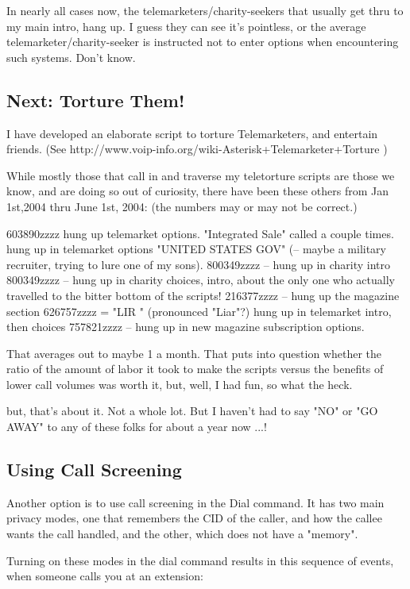 In nearly all cases now, the telemarketers/charity-seekers that
usually get thru to my main intro, hang up. I guess they can see it's
pointless, or the average telemarketer/charity-seeker is instructed
not to enter options when encountering such systems. Don't know. 


\subsection{Next: Torture Them!}

I have developed an elaborate script to torture Telemarketers, and
entertain friends. (See
http://www.voip-info.org/wiki-Asterisk+Telemarketer+Torture )

While mostly those that call in and traverse my teletorture scripts
are those we know, and are doing so out of curiosity, there have been
these others from Jan 1st,2004 thru June 1st, 2004:
(the numbers may or may not be correct.)

603890zzzz     hung up telemarket options.
"Integrated Sale"  called a couple times. hung up in telemarket options
"UNITED STATES GOV"  (-- maybe a military recruiter, trying to lure one of my sons).
800349zzzz -- hung up in charity intro
800349zzzz -- hung up in charity choices, intro, about the only one who actually travelled to the bitter bottom of the scripts!
216377zzzz -- hung up the magazine section
626757zzzz = "LIR    " (pronounced "Liar"?) hung up in telemarket intro, then choices
757821zzzz -- hung up in new magazine subscription options.

That averages out to maybe 1 a month. That puts into question whether
the ratio of the amount of labor it took to make the scripts versus
the benefits of lower call volumes was worth it, but, well, I had fun,
so what the heck.

but, that's about it. Not a whole lot. But I haven't had to say "NO"
or "GO AWAY" to any of these folks for about a year now ...!

\subsection{Using Call Screening}

Another option is to use call screening in the Dial command. It has
two main privacy modes, one that remembers the CID of the caller, and
how the callee wants the call handled, and the other, which does not
have a "memory".

Turning on these modes in the dial command results in this sequence of
events, when someone calls you at an extension:

